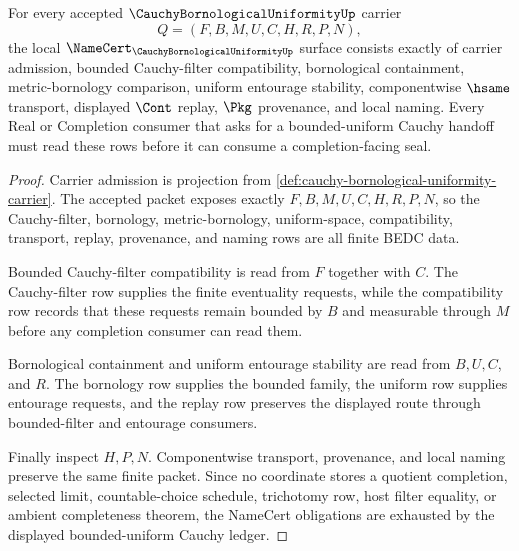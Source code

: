 \begin{theorem}
\label{thm:cauchy-bornological-uniformity-namecert-obligations}
For every accepted $\CauchyBornologicalUniformityUp$ carrier
$$
Q=(F,B,M,U,C,H,R,P,N),
$$
the local $\NameCert_{\CauchyBornologicalUniformityUp}$ surface consists exactly of carrier admission, bounded Cauchy-filter compatibility, bornological containment, metric-bornology comparison, uniform entourage stability, componentwise $\hsame$ transport, displayed $\Cont$ replay, $\Pkg$ provenance, and local naming. Every Real or Completion consumer that asks for a bounded-uniform Cauchy handoff must read these rows before it can consume a completion-facing seal.
\end{theorem}
\begin{proof}
Carrier admission is projection from \autoref{def:cauchy-bornological-uniformity-carrier}. The accepted packet exposes exactly $F,B,M,U,C,H,R,P,N$, so the Cauchy-filter, bornology, metric-bornology, uniform-space, compatibility, transport, replay, provenance, and naming rows are all finite BEDC data.

Bounded Cauchy-filter compatibility is read from $F$ together with $C$. The Cauchy-filter row supplies the finite eventuality requests, while the compatibility row records that these requests remain bounded by $B$ and measurable through $M$ before any completion consumer can read them.

Bornological containment and uniform entourage stability are read from $B,U,C$, and $R$. The bornology row supplies the bounded family, the uniform row supplies entourage requests, and the replay row preserves the displayed route through bounded-filter and entourage consumers.

Finally inspect $H,P,N$. Componentwise transport, provenance, and local naming preserve the same finite packet. Since no coordinate stores a quotient completion, selected limit, countable-choice schedule, trichotomy row, host filter equality, or ambient completeness theorem, the NameCert obligations are exhausted by the displayed bounded-uniform Cauchy ledger.
\end{proof}


